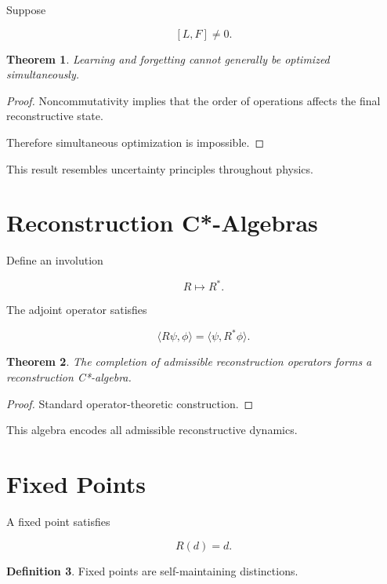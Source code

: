 \documentclass[12pt,oneside]{book}
\theoremstyle{plain} \newtheorem{theorem}{Theorem}[chapter] \newtheorem{lemma}[theorem]{Lemma} \newtheorem{proposition}[theorem]{Proposition} \newtheorem{corollary}[theorem]{Corollary}
\theoremstyle{definition} \newtheorem{definition}[theorem]{Definition} \newtheorem{axiom}[theorem]{Axiom} \newtheorem{construction}[theorem]{Construction}
\theoremstyle{remark} \newtheorem{remark}[theorem]{Remark} \newtheorem{example}[theorem]{Example}
\begin{document}
Suppose

\[
[L,F]
\neq0.
\]

\begin{theorem}

Learning and forgetting cannot generally be optimized simultaneously.

\end{theorem}

\begin{proof}

Noncommutativity implies that the order of operations affects the final reconstructive state.

Therefore simultaneous optimization is impossible.

\end{proof}

This result resembles uncertainty principles throughout physics.

\section{Reconstruction C*-Algebras}

Define an involution

\[
R
\mapsto
R^*.
\]

The adjoint operator satisfies

\[
\langle R\psi,\phi\rangle
=
\langle \psi,R^*\phi\rangle.
\]

\begin{theorem}

The completion of admissible reconstruction operators forms a reconstruction C*-algebra.

\end{theorem}

\begin{proof}

Standard operator-theoretic construction.

\end{proof}

This algebra encodes all admissible reconstructive dynamics.

\section{Fixed Points}

A fixed point satisfies

\[
R(d)
=
d.
\]

\begin{definition}

Fixed points are self-maintaining distinctions.

\end{definition}
\end{document}
